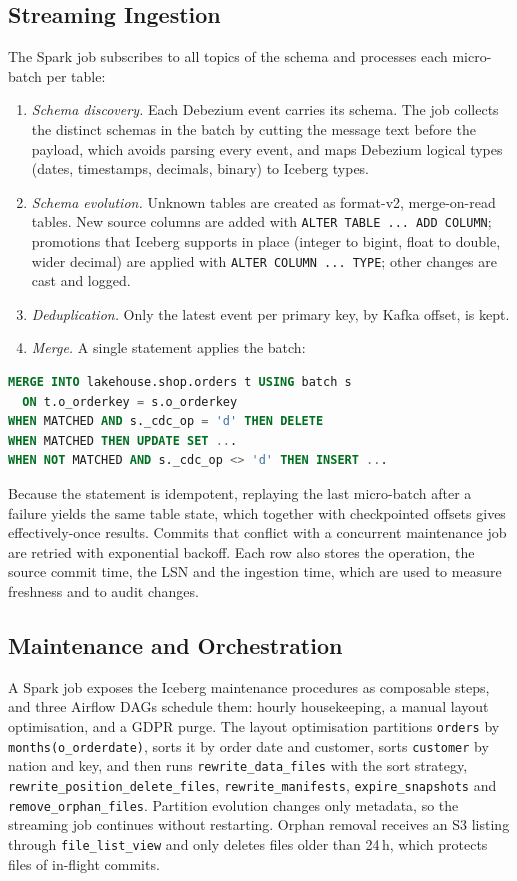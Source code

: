 \documentclass[conference,a4paper]{IEEEtran}
\newcommand{\code}[1]{\texttt{#1}}
\begin{document}
\subsection{Streaming Ingestion}
The Spark job subscribes to all topics of the schema and processes each micro-batch per table:
\begin{enumerate}
\item \emph{Schema discovery.} Each Debezium event carries its schema. The job collects the distinct schemas in the
batch by cutting the message text before the payload, which avoids parsing every event, and maps Debezium logical
types (dates, timestamps, decimals, binary) to Iceberg types.
\item \emph{Schema evolution.} Unknown tables are created as format-v2, merge-on-read tables. New source columns are
added with \code{ALTER TABLE ... ADD COLUMN}; promotions that Iceberg supports in place (integer to bigint, float to
double, wider decimal) are applied with \code{ALTER COLUMN ... TYPE}; other changes are cast and logged.
\item \emph{Deduplication.} Only the latest event per primary key, by Kafka offset, is kept.
\item \emph{Merge.} A single statement applies the batch:
\end{enumerate}
\begin{lstlisting}[language=SQL]
MERGE INTO lakehouse.shop.orders t USING batch s
  ON t.o_orderkey = s.o_orderkey
WHEN MATCHED AND s._cdc_op = 'd' THEN DELETE
WHEN MATCHED THEN UPDATE SET ...
WHEN NOT MATCHED AND s._cdc_op <> 'd' THEN INSERT ...
\end{lstlisting}
Because the statement is idempotent, replaying the last micro-batch after a failure yields the same table state,
which together with checkpointed offsets gives effectively-once results. Commits that conflict with a concurrent
maintenance job are retried with exponential backoff. Each row also stores the operation, the source commit time,
the LSN and the ingestion time, which are used to measure freshness and to audit changes.

\subsection{Maintenance and Orchestration}
A Spark job exposes the Iceberg maintenance procedures as composable steps, and three Airflow DAGs schedule them:
hourly housekeeping, a manual layout optimisation, and a GDPR purge. The layout optimisation partitions
\code{orders} by \code{months(o\_orderdate)}, sorts it by order date and customer, sorts \code{customer} by nation
and key, and then runs \code{rewrite\_data\_files} with the sort strategy, \code{rewrite\_position\_delete\_files},
\code{rewrite\_manifests}, \code{expire\_snapshots} and \code{remove\_orphan\_files}. Partition evolution changes only
metadata, so the streaming job continues without restarting. Orphan removal receives an S3 listing through
\code{file\_list\_view} and only deletes files older than 24\,h, which protects files of in-flight commits.
\end{document}
